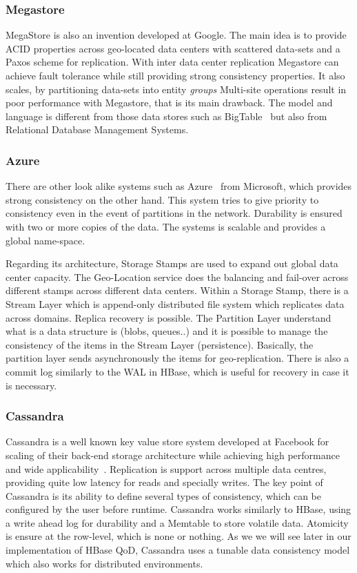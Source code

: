 \subsubsection{Megastore}
MegaStore is also an invention developed at Google. The main idea is to provide ACID properties across geo-located data centers with scattered data-sets and a Paxos scheme for replication. With inter data center replication Megastore can achieve fault tolerance while still providing strong consistency properties. It also scales, by partitioning data-sets into entity \emph{groups} Multi-site operations result in poor performance with Megastore, that is its main drawback. The model and language is different from those data stores such as BigTable~\cite{Chang:2006} but also from Relational Database Management Systems.

\subsubsection{Azure}
There are other look alike systems such as Azure~\cite{Calder:2011} from Microsoft, which provides strong consistency on the other hand. This system tries to give priority to consistency even in the event of partitions in the network. Durability is ensured with two or more copies of the data. The systems is scalable and provides a global name-space.

Regarding its architecture, Storage Stamps are used to expand out global data center capacity. The Geo-Location service does the balancing and fail-over across different stamps across different data centers. Within a Storage Stamp, there is a Stream Layer which is append-only distributed file system which replicates data across domains. Replica recovery is possible. The Partition Layer understand what is a data structure is (blobs, queues..) and it is possible to manage the consistency of the items in the Stream Layer (persistence). Basically, the partition layer sends asynchronously the items for geo-replication. There is also a commit log similarly to the WAL in HBase, which is useful for recovery in case it is necessary.

\subsubsection{Cassandra}
Cassandra is a well known key value store system developed at Facebook for scaling of their back-end storage architecture while achieving high performance and wide applicability~\cite{Lakshman:2010}. Replication is support across multiple data centres, providing quite low latency for reads and specially writes. The key point of Cassandra is its ability to define several types of consistency, which can be configured by the user before runtime. Cassandra works similarly to HBase, using a write ahead log for durability and a Memtable to store volatile data. Atomicity is ensure at the row-level, which is none or nothing. As we we will see later in our implementation of HBase QoD, Cassandra uses a tunable data consistency model which also works for distributed environments.

